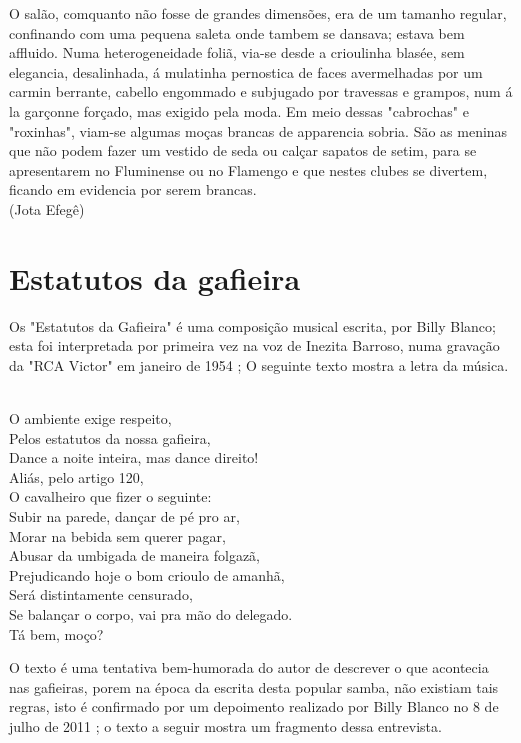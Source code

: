 \begin{tcolorbox}[colback=lowgray,colframe=lowgray]%
O salão, comquanto não fosse de grandes dimensões, era
de um tamanho regular, confinando com uma pequena saleta
onde tambem se dansava; estava bem affluido. Numa
heterogeneidade foliã, via-se desde a crioulinha blasée, sem
elegancia, desalinhada, á mulatinha pernostica de faces
avermelhadas por um carmin berrante, cabello engommado e
subjugado por travessas e grampos, num á la garçonne
forçado, mas exigido pela moda. Em meio dessas "cabrochas"
e "roxinhas", viam-se algumas moças brancas de apparencia
sobria. São as meninas que não podem fazer um vestido de
seda ou calçar sapatos de setim, para se apresentarem no
Fluminense ou no Flamengo e que nestes clubes se divertem,
ficando em evidencia por serem brancas.
~\\
(Jota Efegê)
\end{tcolorbox}

\section{Estatutos da gafieira}
Os "Estatutos da Gafieira" é uma composição musical escrita, por Billy Blanco;
esta foi interpretada por primeira vez na voz de Inezita Barroso, 
numa gravação da "RCA Victor" em janeiro de 1954 \cite{musicaestatuto};
O seguinte texto mostra a letra da música.
\begin{tcolorbox}[colback=lowgray,colframe=lowgray]%
\\
O ambiente exige respeito,\\
Pelos estatutos da nossa gafieira,\\
Dance a noite inteira, mas dance direito!\\
Aliás, pelo artigo 120,\\
O cavalheiro que fizer o seguinte:\\
Subir na parede, dançar de pé pro ar,\\
Morar na bebida sem querer pagar,\\
Abusar da umbigada de maneira folgazã,\\
Prejudicando hoje o bom crioulo de amanhã,\\
Será distintamente censurado,\\
Se balançar o corpo, vai pra mão do delegado.\\
Tá bem, moço?\\
\end{tcolorbox}
O texto é uma tentativa bem-humorada do autor de descrever o que acontecia 
nas gafieiras, porem na época da escrita desta popular samba, não
existiam tais regras, isto é confirmado por um depoimento realizado por 
Billy Blanco no 8 de julho de 2011 \cite{depoimentobilly}; o texto a seguir
mostra um fragmento dessa entrevista.

